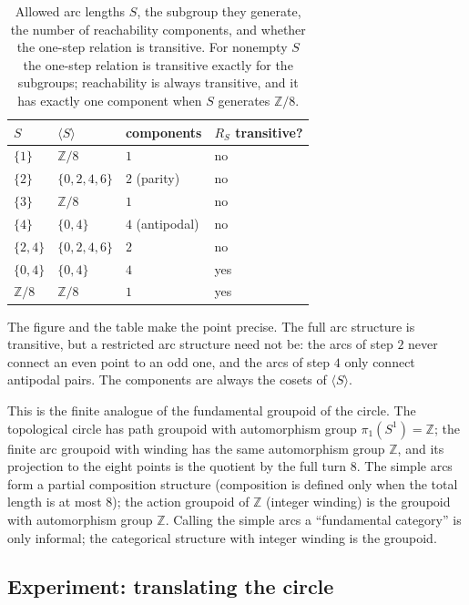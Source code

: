 \documentclass[11pt]{article}
\theoremstyle{definition}
\theoremstyle{remark}
\newcommand{\Z}{\mathbb{Z}}
\begin{document}
\begin{table}[htbp]
\centering
\small
\begin{tabular}{@{}llll@{}}
\toprule
$S$ & $\langle S\rangle$ & components & $R_S$ transitive?\\
\midrule
$\{1\}$ & $\Z/8$ & $1$ & no\\
$\{2\}$ & $\{0,2,4,6\}$ & $2$ (parity) & no\\
$\{3\}$ & $\Z/8$ & $1$ & no\\
$\{4\}$ & $\{0,4\}$ & $4$ (antipodal) & no\\
$\{2,4\}$ & $\{0,2,4,6\}$ & $2$ & no\\
$\{0,4\}$ & $\{0,4\}$ & $4$ & yes\\
$\Z/8$ & $\Z/8$ & $1$ & yes\\
\bottomrule
\end{tabular}
\caption{Allowed arc lengths $S$, the subgroup they generate, the number of
reachability components, and whether the one-step relation is transitive.  For
nonempty $S$ the one-step relation is transitive exactly for the subgroups;
reachability is always transitive, and it has exactly one component when $S$
generates $\Z/8$.}
\label{tab:arcs}
\end{table}

The figure and the table make the point precise.  The full arc structure is
transitive, but a restricted arc structure need not be: the arcs of step $2$
never connect an even point to an odd one, and the arcs of step $4$ only
connect antipodal pairs.  The components are always the cosets of
$\langle S\rangle$.

This is the finite analogue of the fundamental groupoid of the circle.  The
topological circle has path groupoid with automorphism group
$\pi_1(S^1)=\Z$; the finite arc groupoid with winding has the same automorphism
group $\Z$, and its projection to the eight points is the quotient by the full
turn $8$.  The simple arcs form a partial composition structure (composition is defined
only when the total length is at most $8$); the action groupoid of $\Z$
(integer winding) is the groupoid with automorphism group $\Z$.  Calling the
simple arcs a ``fundamental category'' is only informal; the categorical
structure with integer winding is the groupoid.

\subsection{Experiment: translating the circle}
\label{subsec:translate}
\end{document}
